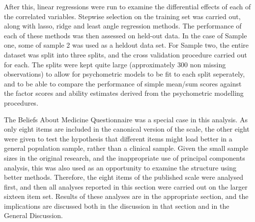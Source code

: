 After this, linear regressions were run to examine the differential effects of each of the correlated variables. Stepwise selection on the training set was carried out, along with lasso, ridge and least angle regression methods. The performance of each of these methods was then assessed on held-out data. In the case of Sample one, some of sample 2 was used as a heldout data set. For Sample two, the entire dataset was split into three splits, and the cross validation procedure carried out for each. The splits were kept quite large (approximately 300 non missing observations) to allow for psychometric models to be fit to each split seperately, and to be able to compare the performance of simple mean/sum scores against the factor scores and ability estimates derived from the psychometric modelling procedures.


The Beliefs About Medicine Questionnaire was a special case in this analysis. As only eight items are included in the canonical version of the scale, the other eight were given to test the hypothesis that different items might load better in a general population sample, rather than a clinical sample. Given the small sample sizes in the original research, and the inappropriate use of principal components analysis, this was also used as an opportunity to examine the structure using better methods. Therefore, the eight items of the published scale were analysed first, and then all analyses reported in this section were carried out on the larger sixteen item set. Results of these analyses are in the appropriate section, and the implications are discussed both in the discussion in that section and in the General Discussion.


